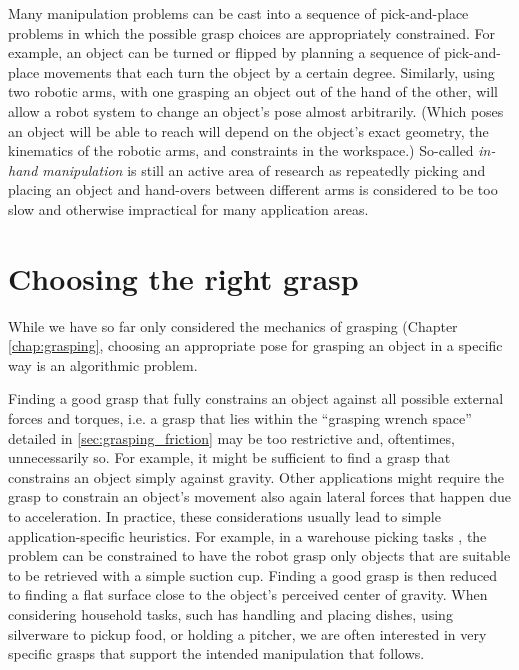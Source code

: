 Many manipulation problems can be cast into a sequence of pick-and-place problems in which the possible grasp choices are appropriately constrained. For example, an object can be turned or flipped by planning a sequence of pick-and-place movements that each turn the object by a certain degree. Similarly, using two robotic arms, with one grasping an object out of the hand of the other, will allow a robot system to change an object's pose almost arbitrarily. (Which poses an object will be able to reach will depend on the object's exact geometry, the kinematics of the robotic arms, and constraints in the workspace.) So-called \textsl{in-hand manipulation} is still an active area of research as repeatedly picking and placing an object and hand-overs between different arms is considered to be too slow and otherwise impractical for many application areas.


\section{Choosing the right grasp}
While we have so far only considered the mechanics of grasping (Chapter \ref{chap:grasping}, choosing an appropriate pose for grasping an object in a specific way is an algorithmic problem. 

Finding a good grasp that fully constrains an object against all possible external forces and torques, i.e. a grasp that lies within the ``grasping wrench space'' detailed in \cref{sec:grasping_friction} may be too restrictive and, oftentimes, unnecessarily so.
For example, it might be sufficient to find a grasp that constrains an object simply against gravity.
Other applications might require the grasp to constrain an object's movement also again lateral forces that happen due to acceleration.
In practice, these considerations usually lead to simple application-specific heuristics. For example, in a warehouse picking tasks \cite{correll2016analysis}, the problem can be constrained to have the robot grasp only objects that are suitable to be retrieved with a simple suction cup. Finding a good grasp is then reduced to finding a flat surface close to the object's perceived center of gravity.
When considering household tasks, such has handling and placing dishes, using silverware to pickup food, or holding a pitcher, we are often interested in very specific grasps that support the intended manipulation that follows.

